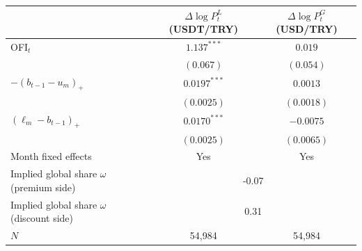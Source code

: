 \begin{tabular}{lcc}
\toprule
 & $\Delta\log P^L_t$ (USDT/TRY) & $\Delta\log P^G_t$ (USD/TRY) \\
\midrule
OFI$_t$ & $1.137^{***}$ & $0.019$ \\
 & $(0.067)$ & $(0.054)$ \\
$-(b_{t-1}-u_m)_+$ & $0.0197^{***}$ & $0.0013$ \\
 & $(0.0025)$ & $(0.0018)$ \\
$(\ell_m-b_{t-1})_+$ & $0.0170^{***}$ & $-0.0075$ \\
 & $(0.0025)$ & $(0.0065)$ \\
\midrule
Month fixed effects & Yes & Yes \\
Implied global share $\omega$ (premium side) & \multicolumn{2}{c}{-0.07} \\
Implied global share $\omega$ (discount side) & \multicolumn{2}{c}{0.31} \\
$N$ & 54,984 & 54,984 \\
\bottomrule
\end{tabular}

